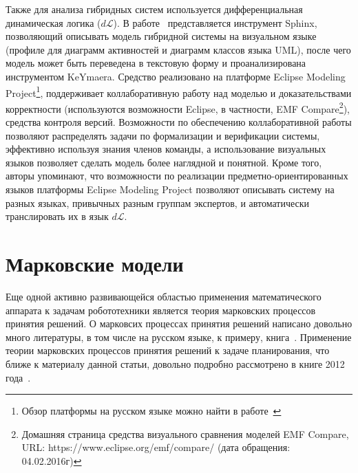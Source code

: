 \documentclass[a4, 14pt]{article}
\begin{document}
Также для анализа гибридных систем используется дифференциальная динамическая логика ($d\mathcal{L}$). 
В работе~\cite{mitsch2014hybrid} представляется инструмент Sphinx, позволяющий описывать модель гибридной 
системы на визуальном языке (профиле для диаграмм активностей и диаграмм классов языка UML), после чего
модель может быть переведена в текстовую форму и проанализирована инструментом KeYmaera. Средство реализовано
на платформе Eclipse Modeling Project\footnote{Обзор платформы на русском языке можно найти в работе~\cite{sorokin2010obzor}},
поддерживает коллаборативную работу над моделью и доказательствами корректности (используются возможности Eclipse, в частности,
EMF Compare\footnote{Домашняя страница средства визуального сравнения моделей EMF Compare, 
URL: https://www.eclipse.org/emf/compare/ (дата обращения: 04.02.2016г)}), средства контроля версий. 
Возможности по обеспечению коллаборативной работы позволяют распределять задачи по формализации и верификации
системы, эффективно используя знания членов команды, а использование визуальных языков позволяет сделать
модель более наглядной и понятной. Кроме того, авторы упоминают, что возможности по реализации предметно-ориентированных языков 
платформы Eclipse Modeling Project позволяют описывать систему на разных языках, привычных разным группам 
экспертов, и автоматически транслировать их в язык $d\mathcal{L}$.

\section{Марковские модели}
Еще одной активно развивающейся областью применения математического 
аппарата к задачам робототехники является теория марковских процессов принятия 
решений. О марковсих процессах принятия решений написано довольно много литературы, 
в том  числе на русском языке, к примеру, книга~\cite{main1977markov}. Применение
теории марковских процессов принятия решений к задаче планирования, что ближе к материалу 
данной статьи, довольно подробно рассмотрено в книге 2012 года~\cite{kolobov2012planning}.
\end{document}
